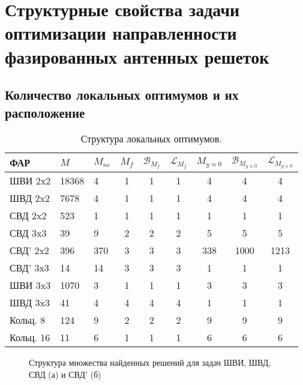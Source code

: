 \chapter{Структурные свойства задачи оптимизации направленности фазированных антенных решеток} \label{sec:exp}

\section{Количество локальных оптимумов и их расположение}\label{subsec:analyzeloc}
\begin{table}[!h]
\centering
    \caption{Структура локальных оптимумов.}
    \label{tab:structure}
\begin{tabular}{|l | l l | c c c | c c c|}
    \hline
    \textbf{ФАР} & \textbf{$M$} & \textbf{$M_{ne}$} & \textbf{$M_{f}$} & \textbf{$\mathcal{B}_{M_f}$} & \textbf{$\mathcal{L}_{M_f}$} & \textbf{$M_{y\approx0}$} & \textbf{$\mathcal{B}_{M_{y\approx0}}$} & \textbf{$\mathcal{L}_{M_{y\approx0}}$}\\
    \hline
    ШВИ 2x2 & 18368 & 4 & 1 & 1 & 1 & 4 & 4 & 4\\
    ШВД 2x2 & 7678  & 4 & 1 & 1 & 1 & 4 & 4 & 4\\
    СВД 2x2  & 523  & 1 & 1 & 1 & 1 & 1 & 1 & 1\\
    СВД 3x3  & 39  & 9 & 2 & 2 & 2 & 5 & 5 & 5\\
    СВД' 2x2  & 396  & 370 & 3 & 3 & 3 & 338 & 1000 & 1213\\
    СВД' 3x3  & 14  & 14 & 3 & 3 & 3 & 1 & 1 & 1\\
    ШВИ 3x3 & 1070  & 3 & 1 & 1 & 1 & 3 & 3 & 3 \\
    ШВД 3x3 & 41  & 4 & 4 & 4 & 4 & 1 & 1 & 1 \\
    Кольц. 8 & 124  & 9 & 2 & 2 & 2 & 9 & 9 & 9\\
    Кольц. 16 & 11  & 6 & 1 & 1 & 1& 6 & 6 & 6\\
    \hline
\end{tabular}
\end{table}

\begin{figure}
\centering
    \begin{minipage}[h]{0.8\linewidth}
    \end{minipage}
    \begin{minipage}[h]{0.8\linewidth}
    \end{minipage}
    \vspace{0.7em}
    \caption{Структура множества найденных решений для задач ШВИ, ШВД, СВД (а) и СВД' (б)}
    \label{ris:fit_dist}
\end{figure}

